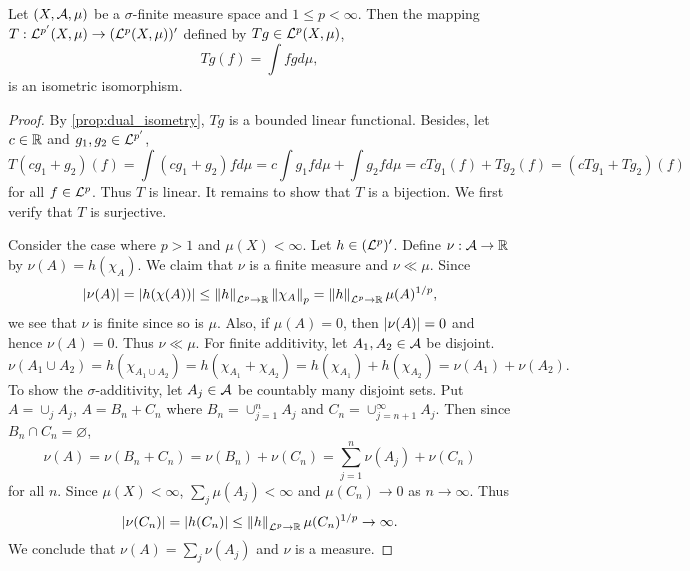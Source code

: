 \begin{theorem}
    Let $(X,\mathcal{A},\mu)$ be a $\sigma$-finite measure space and $1\leq p<\infty$. 
    Then the mapping $T:\mathcal{L}^{p'}(X,\mu)\to(\mathcal{L}^p(X,\mu))'$ defined by 
    $Tg\in\mathcal{L}^p(X,\mu)$, 
    \begin{equation*}
        Tg(f) = \int fg d\mu,
    \end{equation*}
    is an isometric isomorphism.
\end{theorem}
\begin{proof}
    By \cref{prop:dual_isometry}, $Tg$ is a bounded linear functional. 
    Besides, let $c\in\mathbb{R}$ and $g_1,g_2\in\mathcal{L}^{p'}$,
    \begin{equation*}
        T(cg_1+g_2)(f) = \int (cg_1+g_2)fd\mu = c\int g_1fd\mu + \int g_2fd\mu 
        = cTg_1(f) + Tg_2(f) = (cTg_1+Tg_2)(f)
    \end{equation*}
    for all $f\in\mathcal{L}^p$. Thus $T$ is linear. It remains to show 
    that $T$ is a bijection. We first verify that $T$ is surjective. 

    Consider the case where $p>1$ and $\mu(X)<\infty$. Let $h\in(\mathcal{L}^p)'$. 
    Define $\nu:\mathcal{A}\to\mathbb{R}$ by $\nu(A) = h(\chi_A)$. We claim that $\nu$ 
    is a finite measure and $\nu\ll\mu$. Since 
    \begin{equation*}
        \left\lvert {\nu(A)} \right\rvert = \left\lvert {h(\chi(A))} \right\rvert \leq \left\lVert {h} \right\rVert_{\mathcal{L}^p\to\mathbb{R}}\left\lVert {\chi_A} \right\rVert_p 
        = \left\lVert {h} \right\rVert_{\mathcal{L}^p\to\mathbb{R}}\mu(A)^{1/p},
    \end{equation*}
    we see that $\nu$ is finite since so is $\mu$. Also, if $\mu(A) = 0$, 
    then $\left\lvert {\nu(A)} \right\rvert = 0$ and hence $\nu(A) = 0$. Thus $\nu\ll\mu$. 
    For finite additivity, let $A_1,A_2\in\mathcal{A}$ be disjoint. 
    \begin{equation*}
        \nu(A_1\cup A_2) = h(\chi_{A_1\cup A_2}) = h(\chi_{A_1}+\chi_{A_2}) 
        = h(\chi_{A_1}) + h(\chi_{A_2}) = \nu(A_1) + \nu(A_2).
    \end{equation*}
    To show the $\sigma$-additivity, let $A_j\in\mathcal{A}$ be countably many 
    disjoint sets. Put $A = \cup_j A_j$, $A = B_n + C_n$ where 
    $B_n = \cup_{j=1}^{n} A_j$ and $C_n = \cup_{j=n+1}^{\infty} A_j$. 
    Then since $B_n\cap C_n = \varnothing$, 
    \begin{equation*}
        \nu(A) = \nu(B_n + C_n) = \nu(B_n) + \nu(C_n) 
        = \sum_{j=1}^{n}\nu(A_j) + \nu(C_n)
    \end{equation*}
    for all $n$. Since $\mu(X)<\infty$, $\sum_j \mu(A_j)<\infty$ and 
    $\mu(C_n)\to 0$ as $n\to\infty$. Thus 
    \begin{equation*}
        \left\lvert {\nu(C_n)} \right\rvert = \left\lvert {h(C_n)} \right\rvert 
        \leq \left\lVert {h} \right\rVert_{\mathcal{L}^p\to\mathbb{R}}\mu(C_n)^{1/p}\to\infty.
    \end{equation*} 
    We conclude that $\nu(A) = \sum_j \nu(A_j)$ and $\nu$ is a measure. 


\end{proof}

